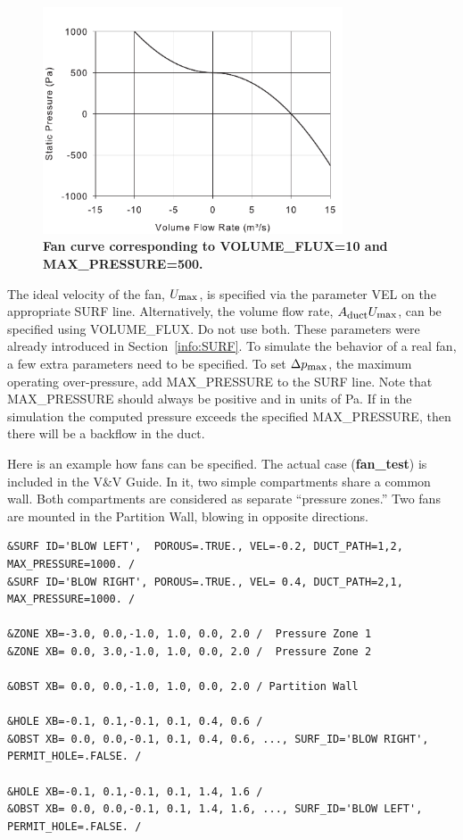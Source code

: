 \documentclass[11pt]{book}
\begin{document}
\begin{figure}[ht!]
\begin{center}
\includegraphics[width=3.5in]{FIGURES/Fan_Curve}
\caption{\bf Fan curve corresponding to {\ct VOLUME\_FLUX=10} and {\ct MAX\_PRESSURE=500}.}
\label{fig:Fan_Curve}
\end{center}
\end{figure}

The ideal velocity of the fan, $U_{\hbox{\footnotesize max}}$, is specified via the parameter {\ct VEL} on the appropriate {\ct SURF} line. Alternatively,
the volume flow rate, $A_{\hbox{\footnotesize duct}} U_{\hbox{\footnotesize max}}$, can be specified using {\ct VOLUME\_FLUX}. Do not use both.  These parameters were
already introduced in Section~\ref{info:SURF}. To simulate the behavior of a real fan, a few extra parameters need to be specified. To set $\Delta p_{\hbox{\footnotesize max}}$,
the maximum operating over-pressure, add {\ct MAX\_PRESSURE} to the {\ct SURF} line. Note that {\ct MAX\_PRESSURE} should always be positive and in units of Pa.
If in the simulation the computed pressure exceeds the specified {\ct MAX\_PRESSURE}, then there will be a backflow in the duct.

Here is an example how fans can be specified. The actual case ({\bf fan\_test}) is included in the V\&V Guide. In it, two simple compartments share a common wall. Both
compartments are considered as separate ``pressure zones.'' Two fans are mounted in the Partition Wall, blowing in opposite directions.

\footnotesize
\begin{verbatim}
&SURF ID='BLOW LEFT',  POROUS=.TRUE., VEL=-0.2, DUCT_PATH=1,2, MAX_PRESSURE=1000. /
&SURF ID='BLOW RIGHT', POROUS=.TRUE., VEL= 0.4, DUCT_PATH=2,1, MAX_PRESSURE=1000. /

&ZONE XB=-3.0, 0.0,-1.0, 1.0, 0.0, 2.0 /  Pressure Zone 1
&ZONE XB= 0.0, 3.0,-1.0, 1.0, 0.0, 2.0 /  Pressure Zone 2

&OBST XB= 0.0, 0.0,-1.0, 1.0, 0.0, 2.0 / Partition Wall

&HOLE XB=-0.1, 0.1,-0.1, 0.1, 0.4, 0.6 /
&OBST XB= 0.0, 0.0,-0.1, 0.1, 0.4, 0.6, ..., SURF_ID='BLOW RIGHT', PERMIT_HOLE=.FALSE. /

&HOLE XB=-0.1, 0.1,-0.1, 0.1, 1.4, 1.6 /
&OBST XB= 0.0, 0.0,-0.1, 0.1, 1.4, 1.6, ..., SURF_ID='BLOW LEFT', PERMIT_HOLE=.FALSE. /
\end{verbatim}
\normalsize
\end{document}
